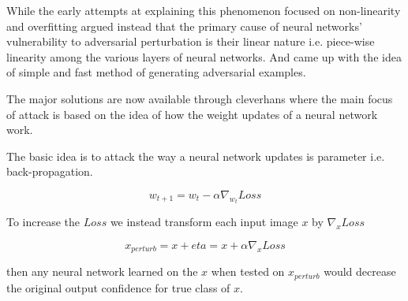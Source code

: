 \documentclass[letterpaper]{article}
\begin{document}
While the early attempts at explaining this phenomenon focused on non-linearity and overfitting \cite{goodfellow2014explaining} argued instead that the primary cause of neural networks' vulnerability to adversarial perturbation is their linear nature i.e. piece-wise linearity among the various layers of neural networks. And came up with the idea of simple and fast method of generating adversarial examples.

The major solutions are now available through cleverhans \cite{papernot2016cleverhans} where the main focus of attack is based on the idea of how the weight updates of a neural network work.

The basic idea is to attack the way a neural network updates is parameter i.e. back-propagation.

\begin{equation}
w_{t+1} = w_{t} -\alpha {\nabla_{w_{t}}  Loss}
\end{equation}

To increase the $Loss$ we instead transform each input image $x$ by $\nabla_{x}  Loss$

\begin{equation}
x_{perturb} = x + eta =  x + \alpha \nabla_{x}  Loss
\end{equation}

then any neural network learned on the $x$ when tested on $x_{perturb}$ would decrease the original output confidence for true class of $x$.
\end{document}
